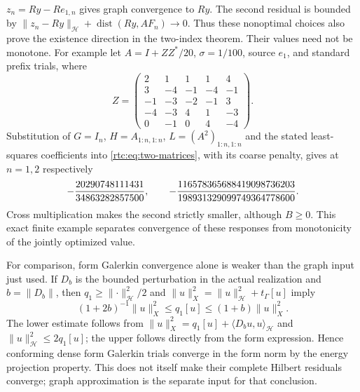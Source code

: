 \documentclass[11pt,a4paper]{article}
\numberwithin{equation}{section}
\theoremstyle{definition}\newtheorem{definition}[theorem]{Definition}
\theoremstyle{remark}\newtheorem{remark}[theorem]{Remark}
\newcommand{\Hh}{\mathcal H}\newcommand{\Hw}{\mathcal H}
\newcommand{\tg}{t_\Gamma}\newcommand{\cg}{c_\Gamma}
\newcommand{\ip}[2]{\langle#1,#2\rangle}\newcommand{\norm}[1]{\lVert#1\rVert}\newcommand{\abs}[1]{\lvert#1\rvert}
\begin{document}
$z_n=Ry-Re_{1,n}$ gives graph convergence to $Ry$.
The second residual is bounded by
$\norm{z_n-Ry}_{\Hh}+\operatorname{dist}(Ry,AF_n)\to0$.
Thus these nonoptimal choices also prove the existence direction in the
two-index theorem. Their values need not be monotone.
For example let $A=I+ZZ^*/20$, $\sigma=1/100$, source $e_1$, and standard
prefix trials, where
\[
 Z=\begin{pmatrix}
 2&1&1&1&4\\3&-4&-1&-4&-1\\-1&-3&-2&-1&3\\
 -4&-3&4&1&-3\\0&-1&0&4&-4
 \end{pmatrix}.
\]
Substitution of $G=I_n$, $H=A_{1:n,1:n}$,
$L=(A^2)_{1:n,1:n}$ and the stated least-squares coefficients into
\eqref{rtc:eq:two-matrices}, with its coarse penalty, gives at $n=1,2$
respectively
\[
 -{20290748111431\over34863282857500},\qquad
 -{116578365688419098736203\over198931329099749364778600}.
\]
Cross multiplication makes the second strictly smaller, although $B\ge0$.
This exact finite example separates convergence of these responses from
monotonicity of the jointly optimized value.

For comparison, form Galerkin convergence alone is weaker than the graph
input just used. If $D_b$ is the bounded perturbation in the actual
realization and $b=\norm{D_b}$, then $q_1\ge\norm{\cdot}_{\Hh}^2/2$
and $\norm u_X^2=\norm u_{\Hh}^2+\tg[u]$ imply
\[
 (1+2b)^{-1}\norm u_X^2\le q_1[u]\le(1+b)\norm u_X^2.
\]
The lower estimate follows from
$\norm u_X^2=q_1[u]+\ip{D_bu}u_{\Hh}$ and
$\norm u_{\Hh}^2\le2q_1[u]$; the upper follows directly from the
form expression. Hence conforming dense form Galerkin trials converge in
the form norm by the energy projection property. This does not itself
make their complete Hilbert residuals converge; graph approximation is the
separate input for that conclusion.
\end{document}
